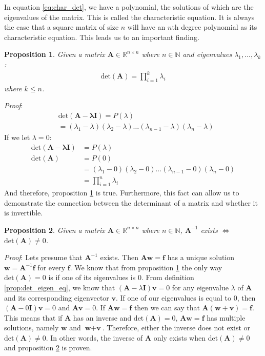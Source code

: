 \documentclass[a4paper,12pt]{book}
\newcommand{\matrx}[1]{\bm{#1}}
\newcommand{\vectr}[1]{\textbf{#1}}
\newcommand{\real}{\mathbb{R}}
\newcommand{\natral}{\mathbb{N}}
\newcommand{\italic}[1]{\textit{#1}}
\newcommand{\dett}[1]{\text{det}(\matrx{#1})}
\newtheorem{proposition}{Proposition}[section]
\begin{document}
	In equation \ref{eq:char_det}, we have a polynomial, the solutions of which are the eigenvalues of the matrix. This is called the characteristic equation. It is always the case that a square matrix of size $ n $ will have an $ n $th degree polynomial as its characteristic equation. This leads us to an important finding.
	
	\begin{proposition}
		\normalfont Given a matrix $ \matrx{A} \in \real^{n \times n} $ where $ n \in \natral $ and eigenvalues $ \lambda_1,\ldots,\lambda_k $: 
		\begin{align}
			\dett{\matrx{A}} = \prod_{i = 1}^{k} \lambda_i
		\end{align}
		where $ k \leq n $. 
		\label{prop:det_prod_eigen}
	\end{proposition}
	\italic{Proof}: 
	\begin{align}
		&\dett{\matrx{A} - \lambda \matrx{I}} = P(\lambda) \\ 
		&= (\lambda_1 - \lambda)(\lambda_2 - \lambda)\ldots(\lambda_{n - 1} - \lambda)(\lambda_n - \lambda)
	\end{align}
	If we let $ \lambda = 0$:
	\begin{align}
		\dett{A - \lambda\matrx{I}} &= P(\lambda) \\
		\dett{A} &= P(0) \\
		&= (\lambda_1 - 0)(\lambda_2 - 0)\ldots(\lambda_{n - 1} - 0)(\lambda_n - 0) \\
		&= \prod_{i = 1}^{n} \lambda_i
	\end{align}
	And therefore, proposition \ref{prop:det_prod_eigen} is true. Furthermore, this fact can allow us to demonstrate the connection between the determinant of a matrix and whether it is invertible.
	\begin{proposition}
		\normalfont Given a matrix $ \matrx{A} \in \real^{n \times n} $ where $ n \in \natral $, $ \matrx{A}^{-1} $ exists $\iff$ $ \dett{A} \ne 0 $.
		\label{prop:det_eq_inv}
	\end{proposition}
	\italic{Proof}: Lets presume that $ \matrx{A}^{-1} $ exists. Then $ \matrx{A}\vectr{w} = \vectr{f} $ has a unique solution $ \vectr{w} = \matrx{A}^{-1}\vectr{f} $ for every $ \vectr{f} $.  We know that from proposition \ref{prop:det_prod_eigen} the only way $ \dett{A} = 0 $ is if one of its eigenvalues is $ 0 $. From definition \ref{prop:det_eigen_eq}, we know that $ (\matrx{A} - \lambda\matrx{I})\vectr{v} = 0 $ for any eigenvalue $ \lambda $ of $ \matrx{A} $ and its corresponding eigenvector $ \vectr{v} $. If one of our eigenvalues is equal to $ 0 $, then $ (\matrx{A} - 0\matrx{I})\vectr{v} = 0$ and $ \matrx{A}\vectr{v} = 0 $. If $ \matrx{A}\vectr{w} = \vectr{f} $ then we can say that $ \matrx{A}(\vectr{w} + \vectr{v}) = \vectr{f} $. This means that if $ \matrx{A} $ has an inverse and $ \dett{A} = 0 $, $ \matrx{A}\vectr{w} = \vectr{f} $ has multiple solutions, namely $ \vectr{w} $ and $ \vectr{w} + \vectr{v} $. Therefore, either the inverse does not exist or $ \dett{A} \ne 0 $. In other words, the inverse of $ \matrx{A} $ only exists when $ \dett{A} \ne 0$ and proposition \ref{prop:det_eq_inv} is proven. 
\end{document}
